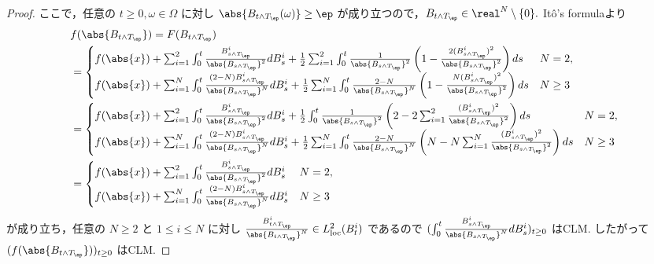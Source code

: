 \documentclass{jsarticle}
\begin{document}
\begin{enumerate}
\begin{proof}
        ここで，任意の $t\ge0,\omega\in\Omega$ に対し $\abs{B_{t\wedge T_\ep}(\omega)}\ge\ep$ が成り立つので，$B_{t\wedge T_\ep}\in\real^N\setminus\{0\}.$
        It\^{o}'s formulaより
        \begin{align}
            & f(\abs{B_{t\wedge T_\ep}})
            = F(B_{t\wedge T_\ep}) \\
            &= 
            \begin{cases}
                f(\abs{x})
                + \sum_{i=1}^{2}\int_0^t\frac{B_{s\wedge T_\ep}^i}{\abs{B_{s\wedge T_\ep}}^2}dB_s^i
                + \frac{1}{2}\sum_{i=1}^{2}\int_0^t\frac{1}{\abs{B_{s\wedge T_\ep}}^2}\left(1-\frac{2(B_{s\wedge T_\ep}^i)^2}{\abs{B_{s\wedge T_\ep}}^2}\right)ds & N=2, \\
                f(\abs{x})
                + \sum_{i=1}^{N}\int_0^t\frac{(2-N)B_{s\wedge T_\ep}^i}{\abs{B_{s\wedge T_\ep}}^N}dB_s^i
                + \frac{1}{2}\sum_{i=1}^{N}\int_0^t\frac{2-N}{\abs{B_{s\wedge T_\ep}}^N}\left(1-\frac{N(B_{s\wedge T_\ep}^i)^2}{\abs{B_{s\wedge T_\ep}}^2}\right)ds & N\ge3
            \end{cases} \\
            &= 
            \begin{cases}
                f(\abs{x})
                + \sum_{i=1}^{2}\int_0^t\frac{B_{s\wedge T_\ep}^i}{\abs{B_{s\wedge T_\ep}}^2}dB_s^i
                + \frac{1}{2}\int_0^t\frac{1}{\abs{B_{s\wedge T_\ep}}^2}\left(2-2\sum_{i=1}^{2}\frac{(B_{s\wedge T_\ep}^i)^2}{\abs{B_{s\wedge T_\ep}}^2}\right)ds & N=2, \\
                f(\abs{x})
                + \sum_{i=1}^{N}\int_0^t\frac{(2-N)B_{s\wedge T_\ep}^i}{\abs{B_{s\wedge T_\ep}}^N}dB_s^i
                + \frac{1}{2}\sum_{i=1}^{N}\int_0^t\frac{2-N}{\abs{B_{s\wedge T_\ep}}^N}\left(N-N\sum_{i=1}^{N}\frac{(B_{s\wedge T_\ep}^i)^2}{\abs{B_{s\wedge T_\ep}}^2}\right)ds & N\ge3
            \end{cases} \\
            &= 
            \begin{cases}
                f(\abs{x})
                + \sum_{i=1}^{2}\int_0^t\frac{B_{s\wedge T_\ep}^i}{\abs{B_{s\wedge T_\ep}}^2}dB_s^i & N=2, \\
                f(\abs{x})
                + \sum_{i=1}^{N}\int_0^t\frac{(2-N)B_{s\wedge T_\ep}^i}{\abs{B_{s\wedge T_\ep}}^N}dB_s^i & N\ge3
            \end{cases}
        \end{align}
        が成り立ち，任意の $N\ge2$ と $1\le i\le N$ に対し $\frac{B_{t\wedge T_\ep}^i}{\abs{B_{t\wedge T_\ep}}^N}\in L_{\mathrm{loc}}^2(B_t^i)$ であるので $(\int_0^t\frac{B_{s\wedge T_\ep}^i}{\abs{B_{s\wedge T_\ep}}^N}dB_s^i)_{t\ge0}$ はCLM.
        したがって $(f(\abs{B_{t\wedge T_\ep}}))_{t\ge0}$ はCLM.
    \end{proof}
    

\end{enumerate}
\end{document}
